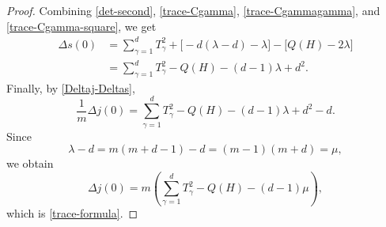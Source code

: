 \documentclass[10pt,a4paper]{amsart}
\begin{document}
\begin{proof}
Combining \eqref{det-second}, \eqref{trace-Cgamma},
\eqref{trace-Cgammagamma}, and \eqref{trace-Cgamma-square}, we get
\[
\begin{aligned}
        \Delta s(0)
        &=
        \sum_{\gamma=1}^{d}T_\gamma^2
        +
        \bigl[-d(\lambda-d)-\lambda\bigr]
        -
        \bigl[Q(H)-2\lambda\bigr]  \\
        &=
        \sum_{\gamma=1}^{d}T_\gamma^2
        -
        Q(H)
        -
        (d-1)\lambda
        +
        d^2 .
\end{aligned}
\]
Finally, by \eqref{Deltaj-Deltas},
\[
        \frac1m\Delta j(0)
        =
        \sum_{\gamma=1}^{d}T_\gamma^2
        -
        Q(H)
        -
        (d-1)\lambda
        +
        d^2-d.
\]
Since
\[
        \lambda-d=m(m+d-1)-d=(m-1)(m+d)=\mu,
\]
we obtain
\[
        \Delta j(0)
        =
        m\left(
          \sum_{\gamma=1}^{d}T_\gamma^2
          -
          Q(H)
          -
          (d-1)\mu
        \right),
\]
which is \eqref{trace-formula}.
\end{proof}
\end{document}
